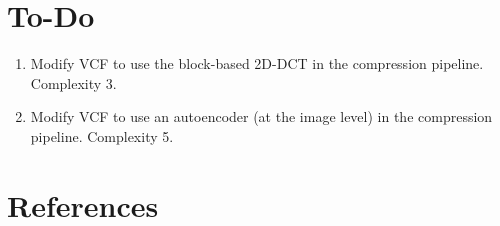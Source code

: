 
\section{To-Do}

\begin{enumerate}
\item Modify VCF to use the block-based 2D-DCT in the compression pipeline. Complexity 3.
\item Modify VCF to use an autoencoder (at the image level) in the compression pipeline. Complexity 5. 
\end{enumerate}


\section{References}

\renewcommand{\addcontentsline}[3]{}%



